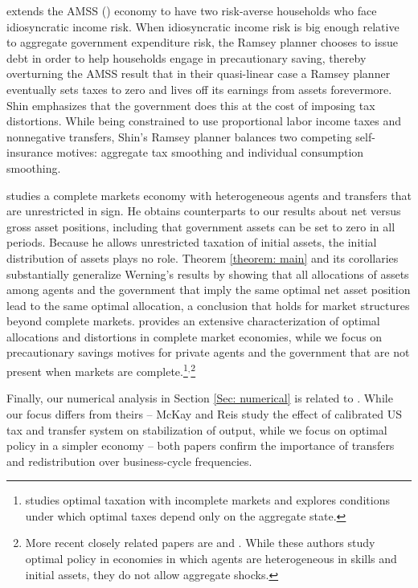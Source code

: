 \documentclass[thmsb,11pt]{article}
\begin{document}
\citet{shin2006ramsey} extends the AMSS  (\citet{Aiyagari2002}) economy to have two risk-averse households who
face idiosyncratic income risk. When idiosyncratic income risk is big enough
relative to aggregate government expenditure risk, the Ramsey planner
chooses to issue debt in order to help households engage in precautionary
saving, thereby overturning the AMSS result that  in their quasi-linear case a
 Ramsey planner  eventually sets taxes to zero and lives off its earnings from assets forevermore.
  Shin emphasizes that the
government does this at the cost of imposing tax distortions. While being
constrained to use proportional labor income taxes and nonnegative
transfers, Shin's Ramsey planner balances two competing self-insurance
motives: aggregate tax smoothing and individual consumption smoothing.

\citet{Wer07a} studies a complete markets economy with heterogeneous agents
and transfers that are unrestricted in sign. He obtains counterparts to our
results about net versus gross asset positions, including that government
assets can be set to zero in all periods. Because he allows unrestricted
taxation of initial assets, the initial distribution of assets plays no
role. Theorem \ref{theorem: main} and its corollaries substantially
generalize Werning's results by showing that all allocations of assets among
agents and the government that imply the same optimal net asset position
lead to the same optimal allocation, a conclusion that holds for market
structures beyond complete markets. \citet{Wer07a} provides an extensive
characterization of optimal allocations and distortions in complete market
economies, while we focus on precautionary savings motives for private
agents and the government that are not present when markets are complete.\footnote{%
\cite{Werning2012} studies optimal taxation with incomplete markets and explores
conditions under which optimal taxes depend only on the aggregate state.}$^,$\footnote{%
More recent closely related papers are \citet{Azzimonti2008,Azzimonti2008a} and \citet{Correia2010}. While these authors study optimal policy in
 economies in which agents are heterogeneous in skills and initial assets, they
  do not allow aggregate shocks.}

  Finally, our numerical analysis in Section \ref{Sec: numerical} is related to \citet{mckay2013}. While our focus differs from theirs -- McKay and Reis study the effect of calibrated US tax and transfer system on stabilization of output, while we focus on optimal policy  in a  simpler economy -- both papers confirm the importance of transfers and redistribution over business-cycle frequencies.
\end{document}
